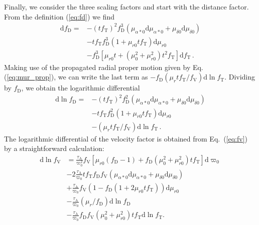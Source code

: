 \documentclass{aa}
\begin{document}
 Finally, we consider the three scaling factors and start with the distance factor.
 From the definition (\ref{eq:fd}) we find
\begin{equation}
  \begin{aligned}
    \mathrm{d}f_\mathrm{D}=
    &-\left(tf_\mathrm{T}\right)^2f_\mathrm{D}^3
    \left(\mu_{\alpha*0}\mathrm{d}\mu_{\alpha*0}+\mu_{\delta0}\mathrm{d}\mu_{\delta0}\right)\\
    &-tf_\mathrm{T}f_\mathrm{D}^3
    \left(1+\mu_{r0}tf_\mathrm{T}\right)\mathrm{d}\mu_{r0}\\
    &-f_\mathrm{D}^3
    \left[\mu_{r0}t+\left(\mu_0^2+\mu_{r0}^2\right)t^2f_\mathrm{T}\right]\mathrm{d}f_\mathrm{T}\,.
 \end{aligned}
\end{equation}
Making use of the propagated radial proper motion given by Eq. (\ref{eq:mur_prop}), we can write the last term as
$-f_\mathrm{D}\left(\mu_r tf_\mathrm{T}/f_\mathrm{V}\right)\mathrm{d}\ln f_\mathrm{T}$.
Dividing by $f_\mathrm{D}$, we obtain the logarithmic differential
\begin{equation}\label{eq:dlnfd}
 \begin{aligned}
    \mathrm{d}\ln f_\mathrm{D}=
    &-\left(tf_\mathrm{T}\right)^2f_\mathrm{D}^2
    \left(\mu_{\alpha*0}\mathrm{d}\mu_{\alpha*0}+\mu_{\delta0}\mathrm{d}\mu_{\delta0}\right)\\
    &-tf_\mathrm{T}f_\mathrm{D}^2
    \left(1+\mu_{r0}tf_\mathrm{T}\right)\mathrm{d}\mu_{r0}\\
    &-\left(\mu_rtf_\mathrm{T}/f_\mathrm{V}\right)\mathrm{d}\ln f_\mathrm{T}\,.
 \end{aligned}
\end{equation}
The logarithmic differential of the velocity factor is obtained from Eq.~(\ref{eq:fv}) by a straightforward calculation:
\begin{equation}
 \begin{aligned}
    \mathrm{d}\ln f_\mathrm{V}&=
    \frac{\tau_\mathrm{A}}{\varpi_0^2}f_\mathrm{V}
    \left[\mu_{r0}\left(f_\mathrm{D}-1\right)+f_\mathrm{D}\left(\mu_0^2+\mu_{r0}^2\right)tf_\mathrm{T}
    \right]\mathrm{d}\varpi_0\\
    &-2\frac{\tau_\mathrm{A}}{\varpi_0}
    tf_\mathrm{T}f_\mathrm{D}f_\mathrm{V}
    \left(\mu_{\alpha*0}\mathrm{d}\mu_{\alpha*0}+\mu_{\delta0}\mathrm{d}\mu_{\delta0}\right)\\
    &+\frac{\tau_\mathrm{A}}{\varpi_0}
    f_\mathrm{V}
    \left(1-f_\mathrm{D}\left(1+2\mu_{r0}tf_\mathrm{T}\right)\right)\mathrm{d}\mu_{r0}\\
    &-\frac{\tau_\mathrm{A}}{\varpi_0}
    \left(\mu_r/f_\mathrm{D}\right)\mathrm{d}\ln f_\mathrm{D}\\
    &-\frac{\tau_\mathrm{A}}{\varpi_0}f_\mathrm{D}f_\mathrm{V}\left(\mu_0^2+\mu_{r0}^2\right)tf_\mathrm{T}
    \mathrm{d}\ln f_\mathrm{T}.
 \end{aligned}
\end{equation}
\end{document}
